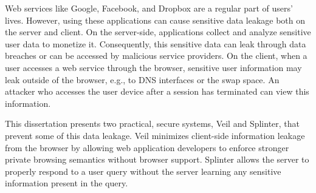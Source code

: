 Web services like Google, Facebook, and Dropbox 
are a regular part of users' lives. However,
using these applications can cause sensitive data
leakage both on the server and client.
On the server-side, applications collect and analyze
sensitive user data to monetize it. Consequently,
this sensitive data can leak through data breaches
or can be accessed by malicious service providers. 
On the client, when a user accesses a web service
through the browser, sensitive user information
may leak outside of the browser, 
e.g., to DNS interfaces or the swap space.
An attacker who accesses the user
device after a session has terminated can view
this information.

This dissertation presents two practical,
secure systems, Veil and Splinter, that
prevent some of this data leakage. Veil minimizes
client-side information leakage from the browser by allowing
web application developers to enforce stronger private browsing 
semantics without browser support. Splinter 
allows the server to properly respond to a user
query without the server learning any sensitive
information present in the query.